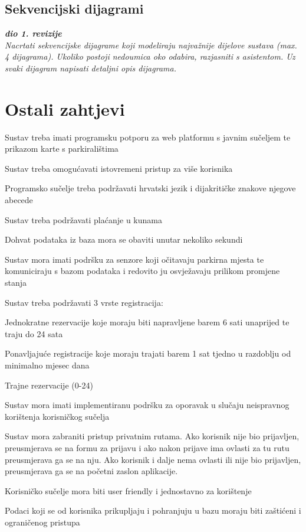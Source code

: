 \subsection{Sekvencijski dijagrami}

\textbf{\textit{dio 1. revizije}}\\

\textit{Nacrtati sekvencijske dijagrame koji modeliraju najvažnije dijelove sustava (max. 4 dijagrama). Ukoliko postoji nedoumica oko odabira, razjasniti s asistentom. Uz svaki dijagram napisati detaljni opis dijagrama.}
\eject

\section{Ostali zahtjevi}

\begin{packed_item}
	
	\item Sustav treba imati programsku potporu za web platformu s javnim sučeljem te prikazom karte s parkiralištima
	\item Sustav treba omogućavati istovremeni pristup za više korisnika 
	\item Programsko sučelje treba podržavati hrvatski jezik i dijakritičke znakove njegove abecede
	\item Sustav treba podržavati plaćanje u kunama
	\item Dohvat podataka iz baza mora se obaviti unutar nekoliko sekundi
	\item Sustav mora imati podršku za senzore koji očitavaju parkirna mjesta te komuniciraju s bazom podataka i redovito ju osvježavaju prilikom promjene stanja
    \item Sustav treba podržavati 3 vrste registracija:
        	\item[] \begin{packed_enum}
		
		\item Jednokratne rezervacije koje moraju biti napravljene barem 6 sati unaprijed te traju do 24 sata
		\item Ponavljajuće registracije koje moraju trajati barem 1 sat tjedno u razdoblju od minimalno mjesec dana
		\item Trajne rezervacije (0-24)
		
	\end{packed_enum}
    \item Sustav mora imati implementiranu podršku za oporavak u slučaju neispravnog korištenja korisničkog sučelja
    \item Sustav mora zabraniti pristup privatnim rutama. Ako korisnik nije bio prijavljen, preusmjerava se na formu za prijavu i ako nakon prijave ima ovlasti za tu rutu preusmjerava ga se na nju. Ako korisnik i dalje nema ovlasti ili nije bio prijavljen, preusmjerava ga se na početni zaslon aplikacije.
    \item Korisničko sučelje mora biti user friendly i jednostavno za korištenje
    \item Podaci koji se od korisnika prikupljaju i pohranjuju u bazu moraju biti zaštićeni i ograničenog pristupa
\end{packed_item}